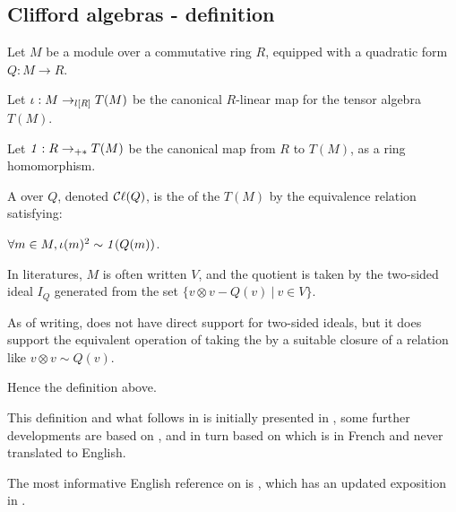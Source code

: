 \subsection{Clifford algebras - definition}
\label{sec:def}

Let $M$ be a module over a commutative ring $R$, equipped with a quadratic form $Q: M \to R$.

\begin{definition}
    \label{CliffordAlgebra}
    \leanok

    Let $\iota : M \to_{l[R]} T(M)$ be the canonical $R$-linear map for the tensor algebra $T(M)$.

    Let $\mathit{1} : R \to_{+*} T(M)$ be the canonical map from $R$ to $T(M)$, as a ring homomorphism.

    A  over $Q$, denoted $\mathop{\mathcal{C}\ell} (Q)$, is
    the  of the  $T(M)$
    by the equivalence relation satisfying:

    $\forall m \in M, \iota(m)^2 \sim \mathit{1}(Q(m))$.
\end{definition}

\begin{remark}
  \label{mk:two_sided_ideals}
  
  In literatures, $M$ is often written $V$, and the quotient is taken by the two-sided ideal $I_Q$ generated from the set
  $\{ v \otimes v - Q(v) \:\vert\: v \in V \}$.

  As of writing, \Mathlib does not have direct support for two-sided ideals,
  but it does support the equivalent operation of taking the  by a suitable closure of
  a relation like $v \otimes v \sim Q(v)$.

  Hence the definition above.

\end{remark}

\begin{remark}
  \label{mk:CliffordAlgebra}
  
  This definition and what follows in \Mathlib is initially presented in \cite{wieser2022formalizing},
  some further developments are based on \cite{grinberg2016clifford}, and in turn based on \cite{bourbaki2007}
  which is in French and never translated to English.

  The most informative English reference on \cite{bourbaki2007} is \cite{jadczyk2019notes}, 
  which has an updated exposition in \cite{jadczyk2023bundle}.

\end{remark}

